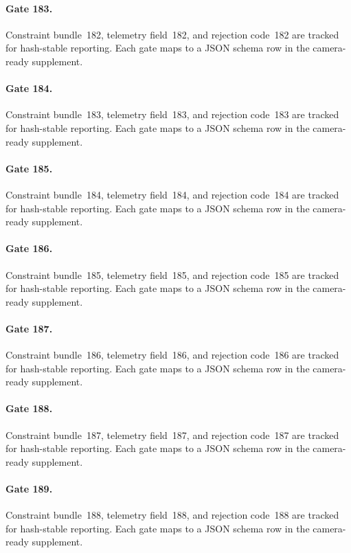 \documentclass[sigconf,nonacm]{acmart}
\begin{document}
\paragraph{Gate 183.}
Constraint bundle~182, telemetry field~182, and rejection code~182 are tracked for hash-stable reporting. Each gate maps to a JSON schema row in the camera-ready supplement. %

\paragraph{Gate 184.}
Constraint bundle~183, telemetry field~183, and rejection code~183 are tracked for hash-stable reporting. Each gate maps to a JSON schema row in the camera-ready supplement. %

\paragraph{Gate 185.}
Constraint bundle~184, telemetry field~184, and rejection code~184 are tracked for hash-stable reporting. Each gate maps to a JSON schema row in the camera-ready supplement. %

\paragraph{Gate 186.}
Constraint bundle~185, telemetry field~185, and rejection code~185 are tracked for hash-stable reporting. Each gate maps to a JSON schema row in the camera-ready supplement. %

\paragraph{Gate 187.}
Constraint bundle~186, telemetry field~186, and rejection code~186 are tracked for hash-stable reporting. Each gate maps to a JSON schema row in the camera-ready supplement. %

\paragraph{Gate 188.}
Constraint bundle~187, telemetry field~187, and rejection code~187 are tracked for hash-stable reporting. Each gate maps to a JSON schema row in the camera-ready supplement. %

\paragraph{Gate 189.}
Constraint bundle~188, telemetry field~188, and rejection code~188 are tracked for hash-stable reporting. Each gate maps to a JSON schema row in the camera-ready supplement. %
\end{document}
